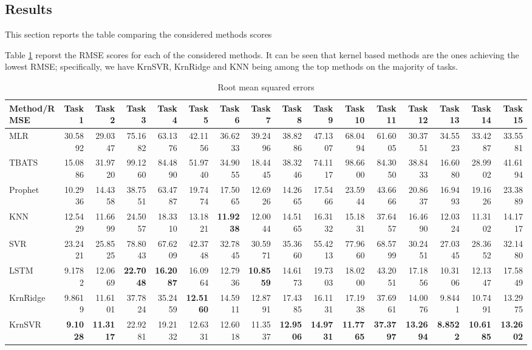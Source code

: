 \subsection{Results}
This section reports the table comparing the considered methods scores 

Table \ref{tab:point_RMSE} reporst the RMSE scores for each of the considered methods. It can be seen that kernel based methods are the ones achieving the lowest RMSE; specifically, we have KrnSVR, KrnRidge and KNN being among the top methods on the majority of tasks.

\begin{table}[!ht]
    \caption{Root mean squared errors}
    \label{tab:point_RMSE}
    \begin{adjustbox}{width=\textwidth, height=3cm}
        \begin{tabular}{lrrrrrrrrrrrrrrr}
            \toprule
            Method/RMSE & Task 1 & Task 2 & Task 3 & Task 4 & Task 5 & Task 6 & Task 7 & Task 8 & Task 9 & Task 10 & Task 11 & Task 12 & Task 13 & Task 14 & Task 15 \\
            \midrule
            MLR & 30.5892 & 29.0347 & 75.1682 & 63.1376 & 42.1156 & 36.6233 & 39.2496 & 38.8286 & 47.1307 & 68.0494 & 61.6005 & 30.3751 & 34.5523 & 33.4287 & 33.5581 \\
            TBATS & 15.0886 & 31.9720 & 99.1260 & 84.4890 & 51.9740 & 34.9055 & 18.4445 & 38.3246 & 74.1117 & 98.6600 & 84.3050 & 38.8433 & 16.6080 & 28.9902 & 41.6194 \\
            Prophet & 10.2936 & 14.4358 & 38.7551 & 63.4787 & 19.7474 & 17.5065 & 12.6926 & 14.2665 & 17.5466 & 23.5944 & 43.6666 & 20.8637 & 16.9493 & 19.1626 & 23.3889 \\
            KNN & 12.5429 & 11.6699 & 24.5057 & 18.3310 & 13.1821 & \textbf{11.9238} & 12.0044 & 14.5165 & 16.3132 & 15.1831 & 37.6457 & 16.4690 & 12.0324 & 11.3102 & 14.1717 \\
            SVR & 23.2421 & 25.8525 & 78.8043 & 67.6209 & 42.3748 & 32.7845 & 30.5971 & 35.3660 & 55.4213 & 77.9660 & 68.5799 & 30.2451 & 27.0345 & 28.3652 & 32.1480 \\
            LSTM & 9.1782 & 12.0669 & \textbf{22.7048} & \textbf{16.2087} & 16.0964 & 12.7936 & \textbf{10.8559} & 14.6173 & 19.7303 & 18.0200 & 43.2051 & 17.1856 & 10.3106 & 12.1347 & 17.5849 \\
            KrnRidge & 9.8619 & 11.6101 & 37.7824 & 35.2459 & \textbf{12.5160} & 14.5911 & 12.8791 & 17.4385 & 16.1131 & 17.1938 & 37.6961 & 14.0076 & 9.8441 & 10.7491 & 13.2975 \\
            KrnSVR & \textbf{9.1028} & \textbf{11.3117} & 22.9281 & 19.2132 & 12.6331 & 12.6018 & 11.3537 & \textbf{12.9506} & \textbf{14.9731} & \textbf{11.7765} & \textbf{37.3797} & \textbf{13.2694} & 
            \textbf{8.8522} & \textbf{10.6185} & \textbf{13.2602} \\
            \bottomrule
            \end{tabular}            
    \end{adjustbox}
\end{table}


